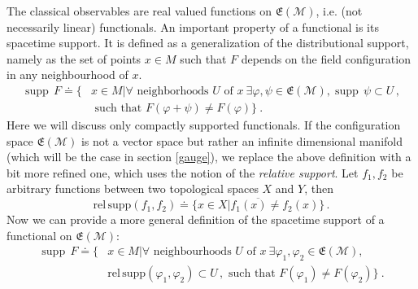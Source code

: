 \documentclass[11pt]{article}
\newcommand{\E}{\mathfrak{E}}
\newcommand{\Mcal}{\mathcal{M}}
\newcommand{\relsupp}{{\mathrm{rel}\,\mathrm{supp}}}      %
\DeclareMathOperator{\supp}{\mathrm{supp}}      %
\newcommand{\ph}{\varphi}
\newcommand{\1}{\mathds{1}}                         %
\begin{document}
{The classical observables are real valued functions on $\mathfrak{E}(\Mcal)$, i.e. (not necessarily linear) functionals. An important property of a functional is its spacetime support. It is defined as a generalization of the distributional support, namely as the set of points $x\in M$ such that $F$ depends on the field configuration in any neighbourhood of $x$.
\begin{align}\label{support}
\supp\, F\doteq\{ & x\in M|\forall \text{ neighborhoods }U\text{ of }x\ \exists \ph,\psi\in\E(\Mcal), \supp\,\psi\subset U\,,
\\ & \text{ such that }F(\ph+\psi)\not= F(\ph)\}\ .\nonumber
\end{align}
Here we will discuss only compactly supported functionals. If the configuration space  $\mathfrak{E}(\Mcal)$ is not a vector space but rather an infinite dimensional manifold (which will be the case in section \ref{gauge}), we replace the above definition with a bit more refined one, which uses the notion of the \textit{relative support}. Let $f_1,f_2$ be arbitrary functions between two topological spaces $X$ and $Y$, then
 \[
 \relsupp (f_1,f_2)\doteq \overline{\{x\in X| f_1(x)\neq f_2(x)\}}\,.
 \]
 Now we can provide a more general definition of the spacetime support of a functional on $\E(\Mcal)$:
 \begin{align}\label{support2}
\supp\, F\doteq\{ & x\in M|\forall \text{ neighbourhoods }U\text{ of }x\ \exists \ph_1,\ph_2\in\E(\Mcal), 
\\ & \relsupp(\ph_1,\ph_2)\subset U\,, \text{ such that }F(\ph_1)\not= F(\ph_2)\}\ .\nonumber
\end{align}

}
\end{document}
